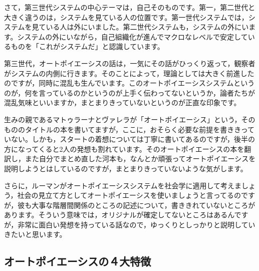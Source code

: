 \documentclass{ltjsbook}
\begin{document}
さて，第三世代システムの中心テーマは，自己そのものです。第一，第二世代と大きく違うのは，システムを見ている人の位置です。第一世代システムでは，システムを見ている人は外にいました。第二世代システムも，システムの外にいます。システムの外にいながら，自己組織化が進んでマクロなレベルで安定しているものを「これがシステムだ」と認識しています。

第三世代，オートポイエーシスの話は，一気にその話がひっくり返って，観察者がシステムの内側に行きます。そのことによって，理論としては大きく前進したのですが，同時に混乱も生んでいます。このオートポイエーシスシステムというのが，何を言っているのかというのが上手く伝わってないというか，論者たちが混乱気味といいますか，まとまりきっていないというのが正直な印象です。

生みの親であるマトゥラーナとヴァレラが「オートポイエーシス」という，そのもののタイトルの本\parencite{Maturana_Varela}を書いてますが，ここに，おそらく必要な前提を書ききっていない。しかも，スタートの着想については丁寧に書いてあるのですが，後半の方になってくると2人の発想も割れています。そのオートポイエーシスの本を翻訳し，また自分でまとめ直した河本も，なんとか頑張ってオートポイエーシスを説明しようとはしている\parencite{KawamotoHideo}のですが，まとまりきっていないような気がします。

さらに，ルーマンがオートポイエーシスシステムを社会学に適用して考えましょう，社会の見立て方としてオートポイエーシスを使いましょうと言ってるのですが，彼も大事な階層間関係のところの記述について，書ききれていないところがあります。そういう意味では，オリジナルが確定してないところはあるんですが，非常に面白い発想を持っている話なので，ゆっくりとしっかりと説明していきたいと思います。

\subsection{オートポイエーシスの４大特徴}
\end{document}
